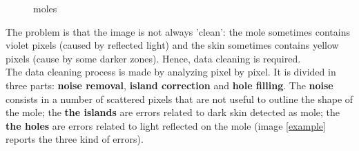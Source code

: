 \documentclass[a4paper,12pt,oneside,titlepage]{article}
\begin{document}
\begin{figure}[H]
		\hfill
		\caption{moles}
		\label{pre_processing}
	\end{figure}
	
	
	The problem is that the image is not always 'clean': the mole sometimes contains violet pixels (caused by reflected light) and the skin sometimes contains yellow pixels (cause by some darker zones). Hence, data cleaning is required. \\
	The data cleaning process is made by analyzing pixel by pixel. It is divided in three parts: \textbf{noise removal}, \textbf{island correction} and \textbf{hole filling}. The \textbf{noise} consists in a number of scattered pixels that are not useful to outline the shape of the mole; the \textbf{the islands} are errors related to dark skin detected as mole; the \textbf{the holes} are errors related to light reflected on the mole (image \ref{example} reports the three kind of errors).
	
\end{document}
